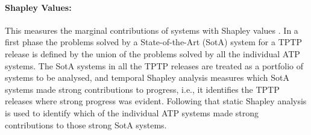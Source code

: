 \documentclass[runningheads]{llncs}
\begin{document}
\vspace*{-0.5em}
\paragraph{Shapley Values:}
This measures the marginal contributions of systems with Shapley values \cite{XH+12}.
In a first phase the problems solved by a State-of-the-Art (SotA) system for a TPTP release is 
defined by the union of the problems solved by all the individual ATP systems.
The SotA systems in all the TPTP releases are treated as a portfolio of systems to be analysed, and 
temporal Shapley analysis \cite{KF+19} measures which SotA systems made strong contributions to 
progress, i.e., it identifies the TPTP releases where strong progress was evident.
Following that static Shapley analysis \cite{FK+16} is used to identify which of 
the individual ATP systems made strong contributions to those strong SotA systems.
\end{document}
